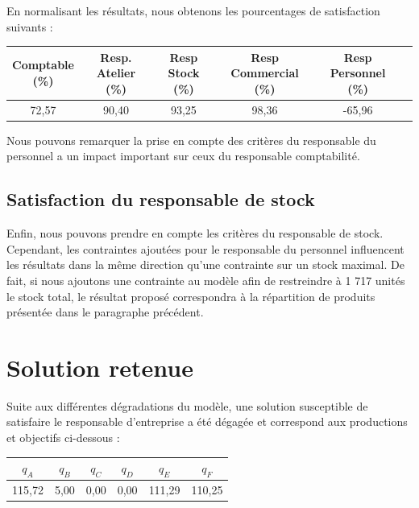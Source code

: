 \documentclass[paper=a4, fontsize=11pt]{report}
\numberwithin{equation}{section}		%
\numberwithin{figure}{section}			%
\numberwithin{table}{section}				%
\begin{document}
En normalisant les résultats, nous obtenons les pourcentages de satisfaction suivants : 

\begin{table}[H]
\begin{center}
\begin{tabular}{c|ccccc}
\shortstack{Comptable \\ \scriptsize{(\%)}} & \shortstack{Resp. Atelier \\ \scriptsize (\%)} & \shortstack{Resp Stock \\ \scriptsize (\%)} & \shortstack{Resp Commercial \\ \scriptsize (\%)} &   \shortstack{Resp Personnel \\ \scriptsize (\%)} \\ 
\hline 
72,57 & 90,40 & 93,25 & 98,36 & -65,96 \\
\end{tabular}
\end{center}
\end{table}

Nous pouvons remarquer la prise en compte des critères du responsable du personnel a un impact important sur ceux du responsable comptabilité.

\subsection{Satisfaction du responsable de stock}

Enfin, nous pouvons prendre en compte les critères du responsable de stock. Cependant, les contraintes ajoutées pour le responsable du personnel influencent les résultats dans la même direction qu'une contrainte sur un stock maximal. De fait, si nous ajoutons une contrainte au modèle afin de restreindre à 1 717 unités le stock total, le résultat proposé correspondra à la répartition de produits présentée dans le paragraphe précédent.

\section{Solution retenue}

Suite aux différentes dégradations du modèle, une solution susceptible de satisfaire le responsable d'entreprise a été dégagée et correspond aux productions et objectifs ci-dessous :

\begin{center}
\begin{tabular}{cccccc}
\hline
$q_A$ & $q_B$ & $q_C$ & $q_D$ & $q_E$ & $q_F$ \\
\hline
115,72 & 5,00 & 0,00 & 0,00 & 111,29 & 110,25 \\
\hline
\end{tabular}
\end{center}
\end{document}
